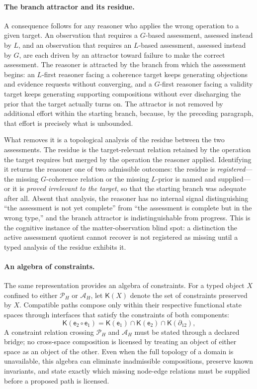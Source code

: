 \documentclass[10pt,twoside,a5paper]{article}
\newcommand{\Pspace}{\ensuremath{\mathcal P_H}}
\newcommand{\ARspace}{\ensuremath{\mathcal A_H}}
\newcommand{\Edge}{\ensuremath{\mathsf e}}
\newcommand{\Constraint}{\ensuremath{\mathsf K}}
\theoremstyle{definition}
\begin{document}
\paragraph{The branch attractor and its residue.}
A consequence follows for any reasoner who applies the wrong operation to a given
target. An observation that requires a $G$-based assessment, assessed instead by $L$,
and an observation that requires an $L$-based assessment, assessed instead by $G$, are
each driven by an attractor toward failure to make the correct assessment. The
reasoner is attracted by the branch from which the assessment begins: an $L$-first
reasoner facing a coherence target keeps generating objections and evidence requests
without converging, and a $G$-first reasoner facing a validity target keeps generating
supporting compositions without ever discharging the prior that the target actually
turns on. The attractor is not removed by additional effort within the starting
branch, because, by the preceding paragraph, that effort is precisely what is
unbounded.

What removes it is a topological analysis of the residue between the two assessments.
The residue is the target-relevant relation retained by the operation the target
requires but merged by the operation the reasoner applied. Identifying it returns the
reasoner one of two admissible outcomes: the residue is \emph{registered}---the
missing $G$-coherence relation or the missing $L$-prior is named and supplied---or it
is \emph{proved irrelevant to the target}, so that the starting branch was adequate
after all. Absent that analysis, the reasoner has no internal signal distinguishing
``the assessment is not yet complete'' from ``the assessment is complete but in the
wrong type,'' and the branch attractor is indistinguishable from progress. This is the
cognitive instance of the matter-observation blind spot: a distinction the active
assessment quotient cannot recover is not registered as missing until a typed analysis
of the residue exhibits it.

\paragraph{An algebra of constraints.}
The same representation provides an algebra of constraints. For a typed object
$X$ confined to either $\Pspace$ or $\ARspace$, let $\Constraint(X)$ denote the
set of constraints preserved by $X$. Compatible paths compose only within their
respective functional state spaces through interfaces that satisfy the constraints
of both components:
\begin{equation}
\Constraint(\Edge_2\circ\Edge_1)
=
\Constraint(\Edge_1)\cap\Constraint(\Edge_2)\cap
\Constraint(\partial_{12}),
\label{eq:constraint-algebra}
\end{equation}
A constraint relation crossing $\Pspace$ and $\ARspace$ must be stated through a
declared bridge; no cross-space composition is licensed by treating an object of
either space as an object of the other. Even when the full topology of a domain is
unavailable, this algebra can eliminate inadmissible compositions, preserve known
invariants, and state exactly which missing node-edge relations must be supplied
before a proposed path is licensed.
\end{document}
